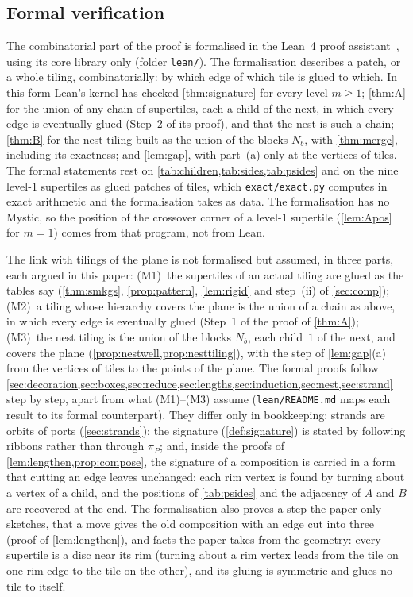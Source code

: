 \documentclass[11pt]{amsart}
\theoremstyle{definition}
\theoremstyle{remark}
\newcommand{\code}[1]{\texttt{#1}}
\begin{document}
\subsection*{Formal verification}
The combinatorial part of the proof is formalised in the Lean~4 proof assistant~\cite{Lean4}, using its core library
only (folder \code{lean/}). The formalisation describes a patch, or a whole tiling, combinatorially: by which edge of
which tile is glued to which. In this form Lean's kernel has checked \cref{thm:signature} for every level $m\ge1$;
\cref{thm:A} for the union of any chain of supertiles, each a child of the next, in which every edge is eventually glued
(Step~2 of its proof), and that the nest is such a chain; \cref{thm:B} for the nest tiling built as the union
of the blocks $N_b$, with \cref{thm:merge}, including its exactness; and \cref{lem:gap}, with part~(a) only at the
vertices of tiles. The formal statements rest on \cref{tab:children,tab:sides,tab:psides} and on the nine level-$1$
supertiles as glued patches of tiles, which \code{exact/exact.py} computes in exact arithmetic and the formalisation
takes as data. The formalisation has no Mystic, so the position of the crossover corner of a level-$1$ supertile
(\cref{lem:Apos} for $m=1$) comes from that program, not from Lean.

The link with tilings of the plane is not formalised but assumed, in three parts, each argued in this paper: (M1)~the
supertiles of an actual tiling are glued as the tables say (\cref{thm:smkgs}, \cref{prop:pattern}, \cref{lem:rigid} and
step~(ii) of \cref{sec:comp}); (M2)~a tiling whose hierarchy covers the plane is the union of a chain as above, in which
every edge is eventually glued (Step~1 of the proof of \cref{thm:A}); (M3)~the nest tiling is the union of the
blocks $N_b$, each child~$1$ of the next, and covers the plane (\cref{prop:nestwell,prop:nesttiling}), with the step of
\cref{lem:gap}(a) from the vertices of tiles to the points of the plane. The formal proofs follow
\cref{sec:decoration,sec:boxes,sec:reduce,sec:lengths,sec:induction,sec:nest,sec:strand} step by step, apart from what
(M1)--(M3) assume (\code{lean/README.md} maps each result to its formal counterpart). They differ only in bookkeeping:
strands are orbits of ports (\cref{sec:strands}); the signature (\cref{def:signature}) is stated by following ribbons
rather than through $\pi_P$; and, inside the proofs of \cref{lem:lengthen,prop:compose}, the signature of a composition
is carried in a form that cutting an edge leaves unchanged: each rim vertex is found by turning about a vertex of a
child, and the positions of \cref{tab:psides} and the adjacency of $A$ and $B$ are recovered at the end. The
formalisation also proves a step the paper only sketches, that a move gives the old composition with an edge cut
into three (proof of \cref{lem:lengthen}), and facts the paper takes from the geometry: every supertile is a disc near
its rim (turning about a rim vertex leads from the tile on one rim edge to the tile on the other), and its gluing is
symmetric and glues no tile to itself.
\end{document}
